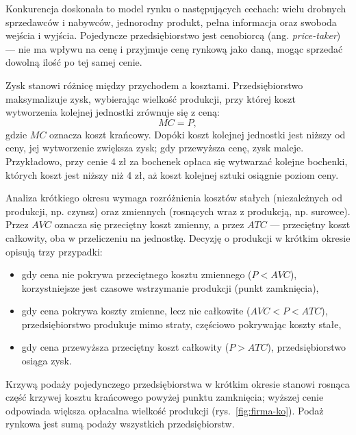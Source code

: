 Konkurencja doskonała to model rynku o następujących cechach: wielu drobnych sprzedawców i nabywców, jednorodny produkt, pełna informacja oraz swoboda wejścia i wyjścia. Pojedyncze przedsiębiorstwo jest cenobiorcą (ang. \textit{price-taker}) --- nie ma wpływu na cenę i przyjmuje cenę rynkową jako daną, mogąc sprzedać dowolną ilość po tej samej cenie.

Zysk stanowi różnicę między przychodem a kosztami. Przedsiębiorstwo maksymalizuje zysk, wybierając wielkość produkcji, przy której koszt wytworzenia kolejnej jednostki zrównuje się z ceną:
\begin{equation}
MC = P,
\end{equation}
gdzie $MC$ oznacza koszt krańcowy. Dopóki koszt kolejnej jednostki jest niższy od ceny, jej wytworzenie zwiększa zysk; gdy przewyższa cenę, zysk maleje. Przykładowo, przy cenie 4 zł za bochenek opłaca się wytwarzać kolejne bochenki, których koszt jest niższy niż 4 zł, aż koszt kolejnej sztuki osiągnie poziom ceny.

Analiza krótkiego okresu wymaga rozróżnienia kosztów stałych (niezależnych od produkcji, np. czynsz) oraz zmiennych (rosnących wraz z produkcją, np. surowce). Przez $AVC$ oznacza się przeciętny koszt zmienny, a przez $ATC$ --- przeciętny koszt całkowity, oba w przeliczeniu na jednostkę. Decyzję o produkcji w krótkim okresie opisują trzy przypadki:
\begin{itemize}
  \item gdy cena nie pokrywa przeciętnego kosztu zmiennego ($P<AVC$), korzystniejsze jest czasowe wstrzymanie produkcji (punkt zamknięcia),
  \item gdy cena pokrywa koszty zmienne, lecz nie całkowite ($AVC<P<ATC$), przedsiębiorstwo produkuje mimo straty, częściowo pokrywając koszty stałe,
  \item gdy cena przewyższa przeciętny koszt całkowity ($P>ATC$), przedsiębiorstwo osiąga zysk.
\end{itemize}

Krzywą podaży pojedynczego przedsiębiorstwa w krótkim okresie stanowi rosnąca część krzywej kosztu krańcowego powyżej punktu zamknięcia; wyższej cenie odpowiada większa opłacalna wielkość produkcji (rys.~\ref{fig:firma-ko}). Podaż rynkowa jest sumą podaży wszystkich przedsiębiorstw.

